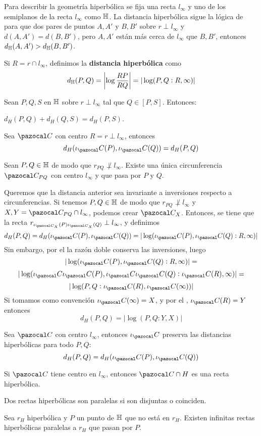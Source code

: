  Para describir la geometría hiperbólica se fija una recta $l_{\infty}$ y uno de los semiplanos de la recta $l_\infty$ como $\mathbb{H}$. La distancia hiperbólica sigue la lógica de para que dos pares de puntos $A, A'$ y $B,B'$ sobre $r\perp l_\infty$ y $d(A,A') = d(B,B')$, pero $A,A'$ están más cerca de $l_\infty$ que $B, B'$, entonces $d_{\mathbb{H}}(A,A') > d_{\mathbb{H}}(B,B')$.

Si $R = r\cap l_\infty$, definimos la \textbf{distancia hiperbólica} como
$$d_{\mathbb{H}}(P,Q) = \left| \log \frac{RP}{RQ} \right| = |\log(P,Q:R,\infty)| $$

 Sean $P,Q,S$ en $\mathbb{H}$ sobre $r \perp l_\infty$ tal que $Q\in[P,S]$. Entonces:
\begin{itemizex}
	\item $d_H (P,Q) + d_H(Q,S) = d_H(P,S)$.
	\item Sea $\C$ con centro $R = r \perp l_\infty$, entonces
	$$d_H(\iota_\C(P), \iota_\C(Q)) = d_H(P,Q)$$
\end{itemizex}

 Sean $P,Q \in \mathbb{H}$ de modo que $r_{PQ} \not\perp l_\infty$. Existe una única circunferencia $\C_{PQ}$ con centro $l_\infty$ y que pasa por $P$ y $Q$.

 Queremos que la distancia anterior sea invariante a inversiones respecto a circunferencias. 
Si tenemos  $P,Q \in \mathbb{H}$ de modo que $r_{PQ} \not\perp l_\infty$ y $X,Y = \C_{PQ}\cap l_\infty$, podemos crear $\C_X$. Entonces, se tiene que la recta $r_{\iota_{\C_X}(P)\iota_{\C_X}(Q)} \perp l_\infty$, y definimos 
$$d_H(P,Q) = d_H(\iota_\C(P), \iota_\C(Q)) = |\log(\iota_\C(P), \iota_\C(Q):R,\infty)|$$
Sin embargo, por el  la razón doble conserva las inversiones, luego
$$|\log(\iota_\C(P), \iota_\C(Q):R,\infty)| =$$$$ |\log(\iota_\C\iota_\C(P), \iota_\C\iota_\C(Q):\iota_\C(R),\infty)| =$$
$$|\log(P, Q:\iota_\C(R),\iota_\C(\infty))|$$
Si tomamos como convención $\iota_\C(\infty) = X$, y por el , $\iota_\C(R) = Y$ entonces
$$d_H(P,Q) = |\log(P,Q:Y,X)|$$

 Sea $\C$ con centro $l_\infty$, entonces $\iota_\C$ preserva las distancias hiperbólicas para todo $P,Q$:
$$d_H(P,Q) = d_H(\iota_\C(P), \iota_\C(Q))$$

 Si $\C$ tiene centro en $l_\infty$, entonces $\C \cap H$ es una recta hiperbólica.

 Dos rectas hiperbólicas son paralelas si son disjuntas o coinciden.

 Sea $r_H$ hiperbólica y $P$ un punto de $\mathbb{H}$ que no está en $r_H$. Existen infinitas rectas hiperbólicas paralelas a $r_H$ que pasan por $P$.




 

